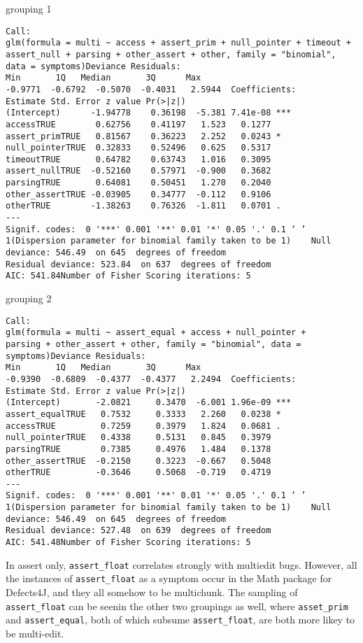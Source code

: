 grouping 1
\begin{lstlisting}
Call:
glm(formula = multi ~ access + assert_prim + null_pointer + timeout + 
assert_null + parsing + other_assert + other, family = "binomial", 
data = symptoms)Deviance Residuals: 
Min       1Q   Median       3Q      Max  
-0.9771  -0.6792  -0.5070  -0.4031   2.5944  Coefficients:
Estimate Std. Error z value Pr(>|z|)    
(Intercept)      -1.94778    0.36198  -5.381 7.41e-08 ***
accessTRUE        0.62756    0.41197   1.523   0.1277    
assert_primTRUE   0.81567    0.36223   2.252   0.0243 *  
null_pointerTRUE  0.32833    0.52496   0.625   0.5317    
timeoutTRUE       0.64782    0.63743   1.016   0.3095    
assert_nullTRUE  -0.52160    0.57971  -0.900   0.3682    
parsingTRUE       0.64081    0.50451   1.270   0.2040    
other_assertTRUE -0.03905    0.34777  -0.112   0.9106    
otherTRUE        -1.38263    0.76326  -1.811   0.0701 .  
---
Signif. codes:  0 '***' 0.001 '**' 0.01 '*' 0.05 '.' 0.1 ‘ ’ 1(Dispersion parameter for binomial family taken to be 1)    Null deviance: 546.49  on 645  degrees of freedom
Residual deviance: 523.84  on 637  degrees of freedom
AIC: 541.84Number of Fisher Scoring iterations: 5
\end{lstlisting}

grouping 2
\begin{lstlisting}
Call:
glm(formula = multi ~ assert_equal + access + null_pointer + 
parsing + other_assert + other, family = "binomial", data = symptoms)Deviance Residuals: 
Min       1Q   Median       3Q      Max  
-0.9390  -0.6809  -0.4377  -0.4377   2.2494  Coefficients:
Estimate Std. Error z value Pr(>|z|)    
(Intercept)       -2.0821     0.3470  -6.001 1.96e-09 ***
assert_equalTRUE   0.7532     0.3333   2.260   0.0238 *  
accessTRUE         0.7259     0.3979   1.824   0.0681 .  
null_pointerTRUE   0.4338     0.5131   0.845   0.3979    
parsingTRUE        0.7385     0.4976   1.484   0.1378    
other_assertTRUE  -0.2150     0.3223  -0.667   0.5048    
otherTRUE         -0.3646     0.5068  -0.719   0.4719    
---
Signif. codes:  0 '***' 0.001 '**' 0.01 '*' 0.05 '.' 0.1 ‘ ’ 1(Dispersion parameter for binomial family taken to be 1)    Null deviance: 546.49  on 645  degrees of freedom
Residual deviance: 527.48  on 639  degrees of freedom
AIC: 541.48Number of Fisher Scoring iterations: 5
\end{lstlisting}

In assert only, \lstinline{assert_float} correlates strongly with multiedit bugs. However, all the instances of \lstinline{assert_float} as a symptom occur in the Math package for Defects4J, and they all somehow to be multichunk. The sampling of \lstinline{assert_float} can be seenin the other two groupings as well, where \lstinline{asset_prim} and \lstinline{assert_equal}, both of which subsume \lstinline{assert_float}, are both more likey to be multi-edit.  

